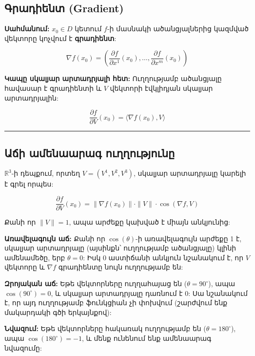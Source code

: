 \documentclass[12pt, a4paper]{article}
\begin{document}
\subsection{Գրադիենտ (Gradient)}

\textbf{Սահմանում:} $x_0 \in D$ կետում $f$-ի մասնակի ածանցյալներից կազմված վեկտորը կոչվում է \textbf{գրադիենտ}:

$$\nabla f(x_0) = \left( \frac{\partial f}{\partial x^1}(x_0), \dots, \frac{\partial f}{\partial x^m}(x_0) \right) \text{}$$

\textbf{Կապը սկալյար արտադրյալի հետ:} Ուղղությամբ ածանցյալը հավասար է գրադիենտի և $V$ վեկտորի էվկլիդյան սկալյար արտադրյալին:

$$\frac{\partial f}{\partial V}(x_0) = \langle \nabla f(x_0), V \rangle \text{}$$

\vspace{1em}
\hrule
\vspace{1em}

\subsection{Աճի ամենաարագ ուղղությունը}

$\mathbb{R}^3$-ի դեպքում, որտեղ $V = (V^1, V^2, V^3)$, սկալյար արտադրյալը կարելի է գրել որպես:

$$\frac{\partial f}{\partial V}(x_0) = \|\nabla f(x_0)\| \cdot \|V\| \cdot \cos(\nabla f, V) \text{}$$

Քանի որ $\|V\| = 1$, ապա արժեքը կախված է միայն անկյունից:

\textbf{Առավելագույն աճ:} Քանի որ $\cos(\theta)$-ի առավելագույն արժեքը 1 է, սկալյար արտադրյալը (այսինքն՝ ուղղությամբ ածանցյալը) կլինի ամենամեծը, երբ $\theta = 0$: Իսկ $0$ աստիճանի անկյուն նշանակում է, որ $V$ վեկտորը և $\nabla f$ գրադիենտը նույն ուղղությամբ են:

\textbf{Զրոյական աճ:} Եթե վեկտորները ուղղահայաց են ($\theta = 90^\circ$), ապա $\cos(90^\circ) = 0$, և սկալյար արտադրյալը դառնում է $0$: Սա նշանակում է, որ այդ ուղղությամբ ֆունկցիան չի փոխվում (շարժվում ենք մակարդակի գծի երկայնքով):

\textbf{Նվազում:} Եթե վեկտորները հակառակ ուղղությամբ են ($\theta = 180^\circ$), ապա $\cos(180^\circ) = -1$, և մենք ունենում ենք ամենաարագ նվազումը:
\end{document}
